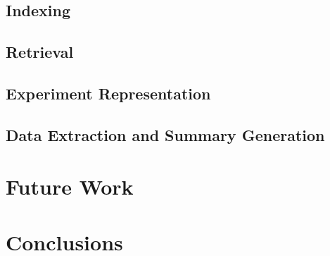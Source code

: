 \documentclass[a4paper]{usiinfbachelorproject}
\begin{document}
\subsection{\textbf{Indexing}} \label{sec:implIndexing}

\subsection{\textbf{Retrieval}} \label{sec:implRetrieval}

\subsection{\textbf{Experiment Representation}} \label{sec:implExperiments}

\subsection{\textbf{Data Extraction and Summary Generation}} \label{impl:dataSummaries}


\section{\textbf{Future Work}} \label{sec:futureWork}


\section{\textbf{Conclusions}} \label{sec:conclusions}


\newpage
\end{document}
